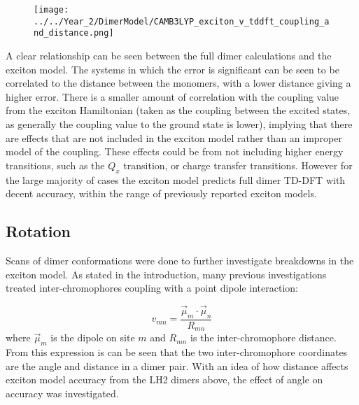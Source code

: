 \begin{figure}
    \centering
    \texttt{[image: ../../Year\_2/DimerModel/CAMB3LYP\_exciton\_v\_tddft\_coupling\_and\_distance.png]}
\end{figure}

A clear relationship can be seen between the full dimer calculations and the exciton
model. The systems in which the error is significant can be seen to be correlated
to the distance between the monomers, with a lower distance giving a higher error.
There is a smaller amount of correlation with the coupling value from the exciton
Hamiltonian (taken as the coupling between the excited states, as generally the 
coupling value to the ground state is lower), implying that there are effects that
are not included in the exciton model rather than an improper model of the coupling.
These effects could be from not including higher energy transitions, such as the $Q_x$ 
transition, or charge transfer transitions. However for the large majority of cases
the exciton model predicts full dimer TD-DFT with decent accuracy, within the range
of previously reported exciton models.

\subsection{Rotation}
\label{subsec:rotation}

Scans of dimer conformations were done to further investigate breakdowns in the
exciton model. As stated in the introduction, many previous investigations treated
inter-chromophores coupling with a point dipole interaction:

\begin{equation}
    v_{mn} = \frac{\vec{\mu}_m \cdot \vec{\mu}_n}{R_{mn}}
\end{equation}
%
where $\vec{\mu}_m$ is the dipole on site $m$ and $R_{mn}$ is the inter-chromophore
distance. From this expression is can be seen that the two inter-chromophore coordinates
are the angle and distance in a dimer pair. With an idea of how distance affects
exciton model accuracy from the LH2 dimers above, the effect of angle on accuracy
was investigated.


